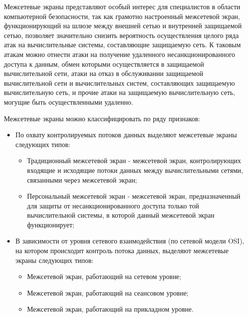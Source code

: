 	Межсетевые экраны представляют особый интерес для специалистов в области компьютерной безопасности, так как
	грамотно настроенный межсетевой экран, функционирующий на шлюзе между внешней сетью и внутренней защищаемой
	сетью, позволяет значительно снизить вероятность осуществления целого ряда атак на вычислительные системы,
	составляющие защищаемую сеть. К таковым атакам можно отнести атаки на получение удаленного несанкционированного
	доступа к данным, обмен которыми осуществляется в защищаемой вычислительной сети, атаки на отказ в обслуживании
	защищаемой вычислительной сети и вычислительных систем, составляющих защищаемую вычислительную сеть,
	и прочие атаки на защищаемую вычислительную сеть, могущие быть осуществленными удаленно.

	Межсетевые экраны можно классифицировать по ряду признаков:

	\begin{itemize}

		\item По охвату контролируемых потоков данных выделяют межсетевые экраны следующих типов:

			\begin{itemize}

				\item Традиционный межсетевой экран - межсетевой экран, контролирующих входящие и исходящие потоки
				данных между вычислительными сетями, связанными через межсетевой экран;
				\item Персональный межсетевой экран - межсетевой экран, предназначенный для защиты от
				несанкционированного доступа только той вычислительной системы, в которой данный межсетевой экран
				функционирует;

			\end{itemize}

		\item В зависимости от уровня сетевого взаимодействия (по сетевой модели OSI),
		на котором происходит контроль потока данных, выделяют межсетевые экраны следующих типов:

			\begin{itemize}

				\item Межсетевой экран, работающий на сетевом уровне;
				\item Межсетевой экран, работающий на сеансовом уровне;
				\item Межсетевой экран, работающий на прикладном уровне.

			\end{itemize}

	\end{itemize}

